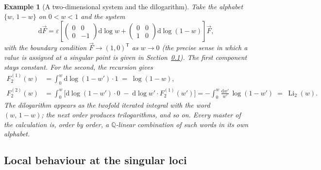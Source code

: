 \documentclass[11pt]{article}
\newcommand{\eps}{\varepsilon}
\newcommand{\dd}{\mathrm{d}}
\newcommand{\Q}{\mathbb{Q}}
\newtheorem{example}[definition]{Example}
\begin{document}
\begin{example}[A two-dimensional system and the dilogarithm]
\label{ex:li2}
Take the alphabet $\{w,\,1-w\}$ on $0<w<1$ and the system
\begin{equation}
  \dd \vec F = \eps\left[
  \begin{pmatrix} 0 & 0\\ 0 & -1\end{pmatrix}\dd\log w
  +
  \begin{pmatrix} 0 & 0\\ 1 & 0 \end{pmatrix}\dd\log(1-w)
  \right]\vec F ,
\end{equation}
with the boundary condition $\vec F \to (1,0)^{\mathsf T}$ as
$w \to 0$ (the precise sense in which a value is assigned at a
singular point is given in Section~\ref{sec:local}).  The first
component stays constant.  For the second, the recursion gives
\begin{align}
  F_2^{(1)}(w) &= \int_0^w \dd\log(1-w')\cdot 1
               \;=\; \log(1-w) ,\\
  F_2^{(2)}(w) &= \int_0^w \Big[\dd\log(1-w')\cdot 0
               \;-\;\dd\log w' \cdot F_2^{(1)}(w')\Big]
               = -\int_0^w \frac{\dd w'}{w'}\,\log(1-w')
               \;=\; \operatorname{Li}_2(w) .
\end{align}
The dilogarithm appears as the twofold iterated integral with the
word $(w,\,1{-}w)$; the next order produces trilogarithms, and so
on.  Every master of the calculation is, order by order, a
$\Q$-linear combination of such words in its own alphabet.
\end{example}

\subsection{Local behaviour at the singular loci}
\label{sec:local}
\end{document}
